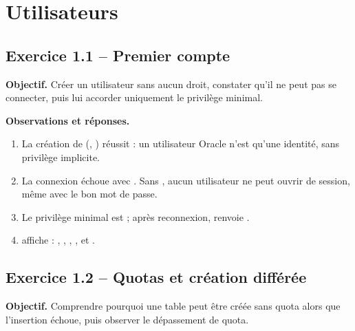 \section{Utilisateurs}

\subsection{Exercice 1.1 -- Premier compte}
\textbf{Objectif.} Créer un utilisateur sans aucun droit, constater qu'il ne peut pas se connecter, puis
lui accorder uniquement le privilège minimal.


\textbf{Observations et réponses.}
\begin{enumerate}
  \item La création de  (, )
        réussit : un utilisateur Oracle n'est qu'une identité, sans privilège implicite.
  \item La connexion  échoue avec . Sans , aucun utilisateur ne peut ouvrir de
        session, même avec le bon mot de passe.
  \item Le privilège minimal est ; après reconnexion,
         renvoie .
  \item {} affiche : , ,
        , ,  et
        .
\end{enumerate}

\subsection{Exercice 1.2 -- Quotas et création différée}
\textbf{Objectif.} Comprendre pourquoi une table peut être créée sans quota alors que l'insertion échoue,
puis observer le dépassement de quota.


